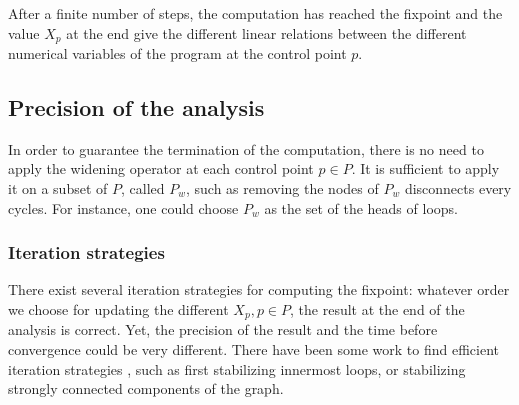 \documentclass[a4paper,english,titlepage,11pt]{article}
\begin{document}
After a finite number of steps, the computation has reached the fixpoint and the
value $X_p$ at the end give the different linear relations between the
different numerical variables of the program at the control point $p$.

\subsection{Precision of the analysis}
In order to guarantee the termination of the computation, there is no need to
apply the widening operator at each control point $p \in P$. It is sufficient to
apply it on a subset of $P$, called $P_w$, such as removing the nodes of $P_w$
disconnects every cycles. For instance, one could choose $P_w$ as the set of the
heads of loops.

\subsubsection{Iteration strategies}
There exist several iteration strategies for computing the fixpoint: whatever
order we choose for updating the different $X_p, p\in P$, the result at the
end of the analysis is correct. Yet, the precision of the result and the time
before convergence could be very different. 
There have been some work to find efficient iteration strategies
\cite{Bou92}, such as first stabilizing innermost loops, or stabilizing strongly
connected components of the graph.
\end{document}

